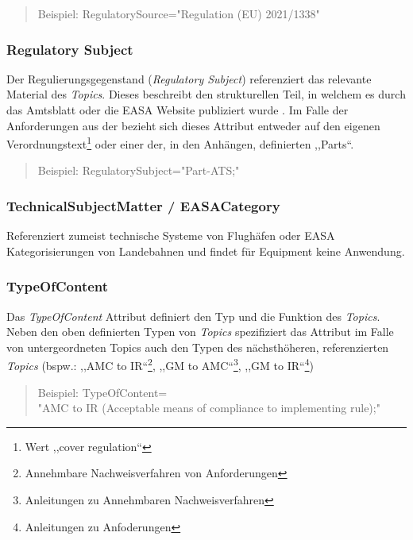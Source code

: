         \begin{quote}
        Beispiel:
        \textsf{RegulatorySource="{}Regulation (EU) 2021/1338"}
    \end{quote}
    
\subsubsection{Regulatory Subject}

    Der Regulierungsgegenstand (\textit{Regulatory Subject}) referenziert das relevante Material des \textit{Topics}. 
    Dieses beschreibt den strukturellen Teil, in welchem es durch das Amtsblatt oder die \ac{EASA} Website publiziert wurde \cite[28]{easa_xml_doc}.
    Im Falle der \atmans Anforderungen aus der  bezieht sich dieses Attribut entweder auf den eigenen Verordnungstext\footnote{Wert ,,cover regulation``} oder einer der, in den Anhängen, definierten ,,Parts``.
    \begin{quote}
        Beispiel:
        \textsf{RegulatorySubject="Part-ATS;"}
    \end{quote}
    
    
\subsubsection{TechnicalSubjectMatter / EASACategory}
    
    Referenziert zumeist technische Systeme von Flughäfen oder \ac{EASA} Kategorisierungen von Landebahnen und findet für \atmans Equipment keine Anwendung. \cite[28--29, 31]{easa_xml_doc} 
    
\pagebreak
\subsubsection{TypeOfContent}
    
    Das \textit{TypeOfContent} Attribut definiert den Typ und die Funktion des \textit{Topics}.
    Neben den oben definierten Typen von \textit{Topics} spezifiziert das Attribut im Falle von untergeordneten Topics auch den Typen des nächsthöheren, referenzierten \textit{Topics} 
    (bspw.: ,,AMC to IR``\footnote{Annehmbare Nachweisverfahren von Anforderungen}, ,,GM to AMC``\footnote{Anleitungen zu Annehmbaren Nachweisverfahren}, ,,GM to IR``\footnote{Anleitungen zu Anfoderungen})
    
    \begin{quote}
        Beispiel:
        \textsf{TypeOfContent=\\"{}AMC to IR (Acceptable means of compliance to implementing rule);"}
    \end{quote}
    
